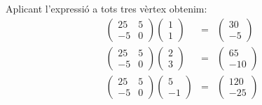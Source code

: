   Aplicant l'expressió a tots tres vèrtex obtenim:
  \begin{eqnarray*}
    \begin{pmatrix}25&5\\-5&0\end{pmatrix} \begin{pmatrix}1\\1\end{pmatrix}&=&\begin{pmatrix}30\\-5\end{pmatrix}\\
    \begin{pmatrix}25&5\\-5&0\end{pmatrix} \begin{pmatrix}2\\3\end{pmatrix}&=&\begin{pmatrix}65\\-10\end{pmatrix}\\
    \begin{pmatrix}25&5\\-5&0\end{pmatrix} \begin{pmatrix}5\\-1\end{pmatrix}&=&\begin{pmatrix}120\\-25\end{pmatrix}
  \end{eqnarray*}
  \blacksquare
